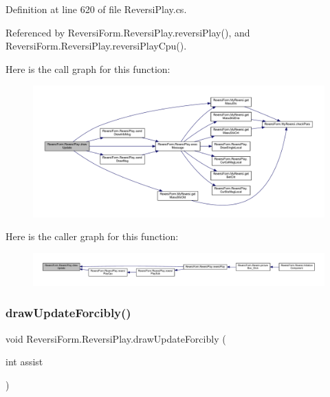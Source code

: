 Definition at line 620 of file Reversi\+Play.\+cs.



Referenced by Reversi\+Form.\+Reversi\+Play.\+reversi\+Play(), and Reversi\+Form.\+Reversi\+Play.\+reversi\+Play\+Cpu().

Here is the call graph for this function\+:
\nopagebreak
\begin{figure}[H]
\begin{center}
\leavevmode
\includegraphics[width=350pt]{class_reversi_form_1_1_reversi_play_af1415f15759ba8475b4b5afca3a35017_cgraph}
\end{center}
\end{figure}
Here is the caller graph for this function\+:
\nopagebreak
\begin{figure}[H]
\begin{center}
\leavevmode
\includegraphics[width=350pt]{class_reversi_form_1_1_reversi_play_af1415f15759ba8475b4b5afca3a35017_icgraph}
\end{center}
\end{figure}
\mbox{\label{class_reversi_form_1_1_reversi_play_accc1d553ba6a6c2a5f0c58316b40a183}} 
\subsubsection{\texorpdfstring{draw\+Update\+Forcibly()}{drawUpdateForcibly()}}
{\footnotesize\ttfamily void Reversi\+Form.\+Reversi\+Play.\+draw\+Update\+Forcibly (\begin{DoxyParamCaption}\item[{int}]{assist }\end{DoxyParamCaption})}




